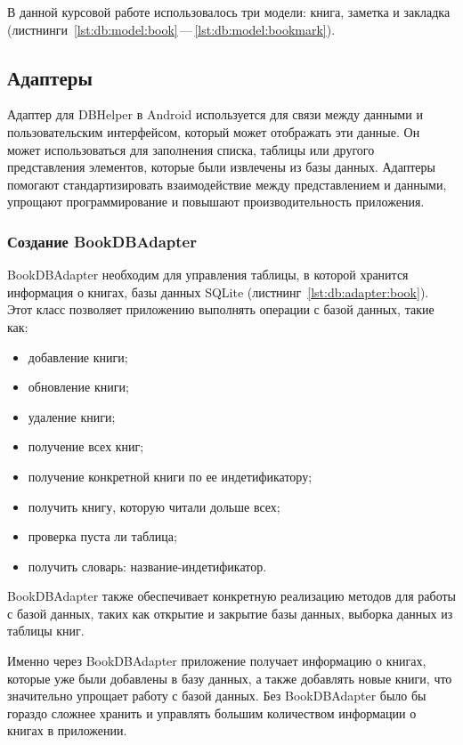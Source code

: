 В данной курсовой работе использовалось три модели: книга, заметка и закладка
(листнинги~\ref{lst:db:model:book}\,---\,\ref{lst:db:model:bookmark}).

\subsection{Адаптеры}
Адаптер для DBHelper в Android используется для связи между данными
и пользовательским интерфейсом, который может отображать эти данные.
Он может использоваться для заполнения списка, таблицы или
другого представления элементов, которые были извлечены из базы данных.
Адаптеры помогают стандартизировать взаимодействие между представлением
и данными, упрощают программирование
и повышают производительность приложения.

\subsubsection{Создание BookDBAdapter}
BookDBAdapter необходим для управления таблицы, в которой хранится информация
о книгах, базы данных SQLite (листнинг~\ref{lst:db:adapter:book}).
Этот класс позволяет приложению выполнять операции
с базой данных, такие как:

\begin{itemize}
	\item добавление книги;
	\item обновление книги;
	\item удаление книги; 
	\item получение всех книг;
	\item получение конкретной книги по ее индетификатору;
	\item получить книгу, которую читали дольше всех;
	\item проверка пуста ли таблица;
	\item получить словарь: название-индетификатор.
\end{itemize}

BookDBAdapter также обеспечивает конкретную реализацию методов
для работы с базой данных, таких как открытие и закрытие базы данных,
выборка данных из таблицы книг.\par
Именно через BookDBAdapter приложение получает информацию о книгах,
которые уже были добавлены в базу данных, а также добавлять новые книги,
что значительно упрощает работу с базой данных.
Без BookDBAdapter было бы гораздо сложнее хранить
и управлять большим количеством информации о книгах в приложении.

